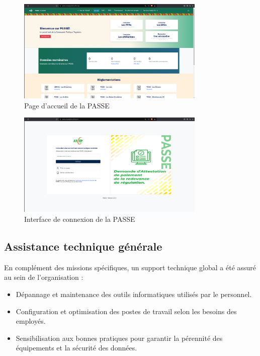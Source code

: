 \begin{figure}[H]
    \centering
    \includegraphics[width=0.8\textwidth]{images/passe/home.png}
    \caption{Page d'accueil de la \ac{PASSE}}
    \label{fig:page-accueil_pass}
\end{figure}

\begin{figure}[H]
    \centering
    \includegraphics[width=0.8\textwidth]{images/passe/login.png}
    \caption{Interface de connexion de la \ac{PASSE}}
    \label{fig:interface-login_pass}
\end{figure}

\subsection{Assistance technique générale}
En complément des missions spécifiques, un support technique global a été assuré au sein de l'organisation :
\begin{itemize}
    \item Dépannage et maintenance des outils informatiques utilisés par le personnel.
    \item Configuration et optimisation des postes de travail selon les besoins des employés.
    \item Sensibilisation aux bonnes pratiques pour garantir la pérennité des équipements et la sécurité des données.
\end{itemize}

